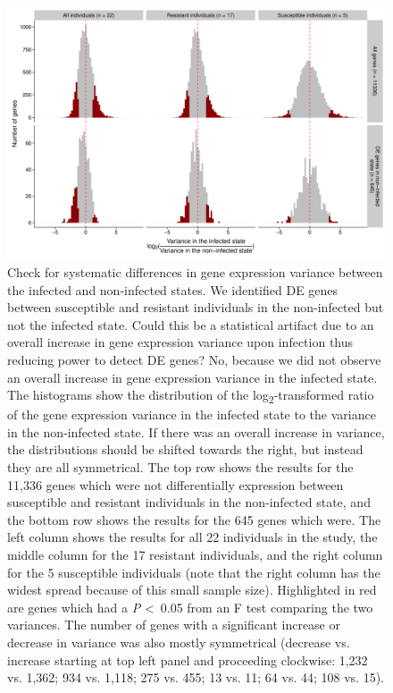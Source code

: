 \documentclass[fleqn,10pt]{wlscirep}
\begin{document}
\begin{figure}[ht]
\centering
\includegraphics[width=\linewidth]{../figure/variance.pdf}
\caption{
Check for systematic differences in gene expression variance between
the infected and non-infected states. We identified DE genes between
susceptible and resistant individuals in the non-infected but not the
infected state. Could this be a statistical artifact due to an overall
increase in gene expression variance upon infection thus reducing
power to detect DE genes? No, because we did not observe an overall
increase in gene expression variance in the infected state. The
histograms show the distribution of the
log\textsubscript{2}-transformed ratio of the gene expression variance
in the infected state to the variance in the non-infected state. If
there was an overall increase in variance, the distributions should be
shifted towards the right, but instead they are all symmetrical. The
top row shows the results for the 11,336 genes which were not
differentially expression between susceptible and resistant
individuals in the non-infected state, and the bottom row shows the
results for the 645 genes which were. The left column shows the
results for all 22 individuals in the study, the middle column for the
17 resistant individuals, and the right column for the 5 susceptible
individuals (note that the right column has the widest spread because
of this small sample size). Highlighted in red are genes which had a
\emph{P} \textless \, 0.05 from an F test comparing the two variances.
The number of genes with a significant increase or decrease in
variance was also mostly symmetrical (decrease vs. increase starting
at top left panel and proceeding clockwise: 1,232 vs. 1,362; 934 vs.
1,118; 275 vs. 455; 13 vs. 11; 64 vs. 44; 108 vs. 15).
}
\label{fig:variance}
\end{figure}
\end{document}
